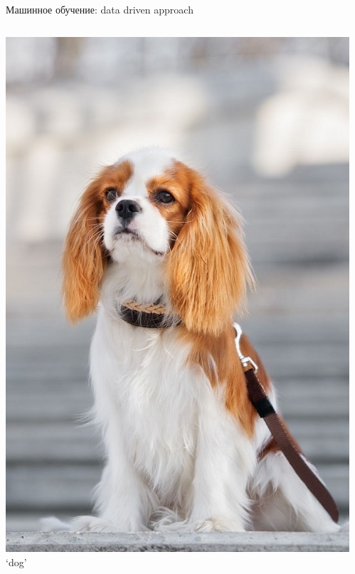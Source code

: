 \documentclass[aspectratio=169, professionalfonts]{beamer}
\begin{document}
\begin{frame}{Машинное обучение: data driven approach}
\begin{columns}
\begin{column}{.1\linewidth}
            \centering
            \includegraphics[width=\linewidth]{figures/fig30-dataset-sample.jpg}
            `dog'
        \end{column}
        \begin{column}{.1\linewidth}
            \centering

\end{column}
\end{columns}
\end{frame}
\end{document}
